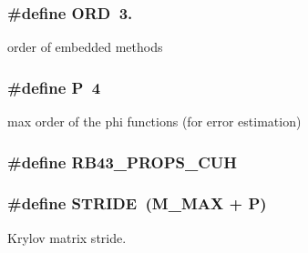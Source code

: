 \subsubsection[{\texorpdfstring{O\+RD}{ORD}}]{\setlength{\rightskip}{0pt plus 5cm}\#define O\+RD~3.}\hypertarget{exprb43__props_8cuh_ac5232262b17b940a7b54e6e56439aa24}{}\label{exprb43__props_8cuh_ac5232262b17b940a7b54e6e56439aa24}


order of embedded methods 

\subsubsection[{\texorpdfstring{P}{P}}]{\setlength{\rightskip}{0pt plus 5cm}\#define P~4}\hypertarget{exprb43__props_8cuh_a2748566f4c443ee77aa831e63dbb5ebe}{}\label{exprb43__props_8cuh_a2748566f4c443ee77aa831e63dbb5ebe}


max order of the phi functions (for error estimation) 

\subsubsection[{\texorpdfstring{R\+B43\+\_\+\+P\+R\+O\+P\+S\+\_\+\+C\+UH}{RB43_PROPS_CUH}}]{\setlength{\rightskip}{0pt plus 5cm}\#define R\+B43\+\_\+\+P\+R\+O\+P\+S\+\_\+\+C\+UH}\hypertarget{exprb43__props_8cuh_a662425e5e115738094e7136bcfea795f}{}\label{exprb43__props_8cuh_a662425e5e115738094e7136bcfea795f}
\subsubsection[{\texorpdfstring{S\+T\+R\+I\+DE}{STRIDE}}]{\setlength{\rightskip}{0pt plus 5cm}\#define S\+T\+R\+I\+DE~({\bf M\+\_\+\+M\+AX} + {\bf P})}\hypertarget{exprb43__props_8cuh_a351d54267048643c4365f6a24641d0cf}{}\label{exprb43__props_8cuh_a351d54267048643c4365f6a24641d0cf}


Krylov matrix stride. 

